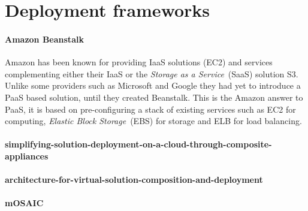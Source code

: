 \section{Deployment frameworks}

\paragraph{Amazon Beanstalk}

Amazon has been known for providing IaaS solutions (EC2) and services complementing 
either their IaaS or the \emph{Storage as a Service}~(SaaS) solution S3.
Unlike some providers such as Microsoft and Google they had yet to introduce
a PaaS based solution, until they created Beanstalk.
This is the Amazon answer to PaaS, it is based on pre-configuring 
a stack of existing services such as EC2 for computing, \emph{Elastic Block Storage}~(EBS)
for storage and ELB for load balancing.

\paragraph{simplifying-solution-deployment-on-a-cloud-through-composite-appliances}
\paragraph{architecture-for-virtual-solution-composition-and-deployment}

\paragraph{mOSAIC}

